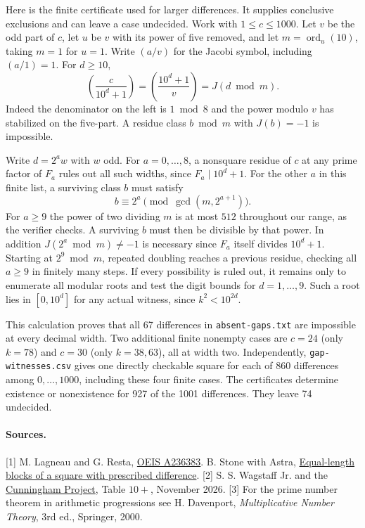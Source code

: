 \documentclass[11pt,letterpaper]{article}
\begin{document}
Here is the finite certificate used for larger differences. It supplies conclusive exclusions and can leave a case undecided. Work with $1\le c\le1000$. Let $v$ be the odd part of $c$, let $u$ be $v$ with its power of five removed, and let $m=\operatorname{ord}_{u}(10)$, taking $m=1$ for $u=1$. Write $(a/v)$ for the Jacobi symbol, including $(a/1)=1$. For $d\ge10$,
\[
 \left(\frac{c}{10^d+1}\right)
   =\left(\frac{10^d+1}{v}\right)=J(d\bmod m).
\]
Indeed the denominator on the left is $1\bmod8$ and the power modulo $v$ has stabilized on the five-part. A residue class $b\bmod m$ with $J(b)=-1$ is impossible.

Write $d=2^a w$ with $w$ odd. For $a=0,\ldots,8$, a nonsquare residue of $c$ at any prime factor of $F_a$ rules out all such widths, since $F_a\mid 10^d+1$. For the other $a$ in this finite list, a surviving class $b$ must satisfy
\[
  b\equiv 2^a\pmod{\gcd(m,2^{a+1})}.
\]
For $a\ge9$ the power of two dividing $m$ is at most $512$ throughout our range, as the verifier checks. A surviving $b$ must then be divisible by that power. In addition $J(2^a\bmod m)\ne-1$ is necessary since $F_a$ itself divides $10^d+1$. Starting at $2^9\bmod m$, repeated doubling reaches a previous residue, checking all $a\ge9$ in finitely many steps. If every possibility is ruled out, it remains only to enumerate all modular roots and test the digit bounds for $d=1,\ldots,9$. Such a root lies in $[0,10^d]$ for any actual witness, since $k^2<10^{2d}$.

This calculation proves that all 67 differences in \texttt{absent-gaps.txt} are impossible at every decimal width. Two additional finite nonempty cases are $c=24$ (only $k=78$) and $c=30$ (only $k=38,63$), all at width two. Independently, \texttt{gap-witnesses.csv} gives one directly checkable square for each of 860 differences among $0,\ldots,1000$, including these four finite cases. The certificates determine existence or nonexistence for 927 of the 1001 differences. They leave 74 undecided.

\paragraph{Sources.}
[1] M. Lagneau and G. Resta, \href{https://oeis.org/A236383}{OEIS A236383}. B. Stone with Astra, \href{https://github.com/blakestone-x/math/blob/d8555a3a1d36da63c29db7d17beb09729cc74252/A236383/concatenated-squares.pdf}{Equal-length blocks of a square with prescribed difference}.
[2] S. S. Wagstaff Jr. and the \href{https://homes.cerias.purdue.edu/~ssw/cun/}{Cunningham Project}, Table $10+$, November 2026.
[3] For the prime number theorem in arithmetic progressions see H. Davenport, \emph{Multiplicative Number Theory}, 3rd ed., Springer, 2000.
\end{document}
